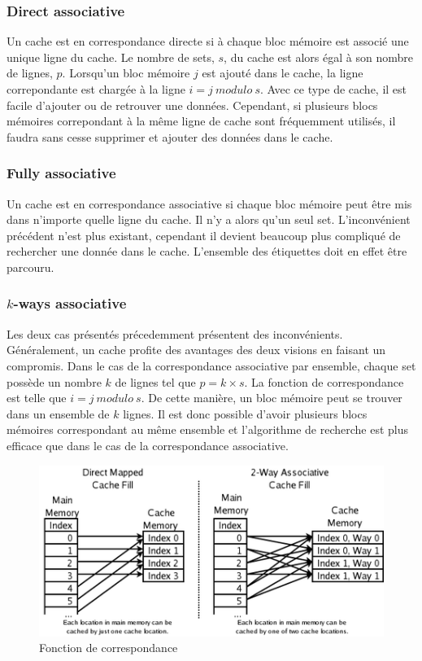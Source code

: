 \documentclass[a4paper]{article}
\begin{document}
\subsubsection{Direct associative}
\indent Un cache est en correspondance directe si à chaque bloc mémoire est associé une unique ligne du cache. Le nombre de sets, $s$, du cache est alors égal à son nombre de lignes, $p$. Lorsqu'un bloc mémoire $j$ est ajouté dans le cache, la ligne correpondante est chargée à la ligne $i = j\ modulo\ s$. Avec ce type de cache, il est facile d'ajouter ou de retrouver une données. Cependant, si plusieurs blocs mémoires correpondant à la même ligne de cache sont fréquemment utilisés, il faudra sans cesse supprimer et ajouter des données dans le cache.

\subsubsection{Fully associative}
\indent Un cache est en correspondance associative si chaque bloc mémoire peut être mis dans n'importe quelle ligne du cache. Il n'y a alors qu'un seul set. L'inconvénient précédent n'est plus existant, cependant il devient beaucoup plus compliqué de rechercher une donnée dans le cache. L'ensemble des étiquettes doit en effet être parcouru.

\subsubsection{$k$-ways associative}
\indent Les deux cas présentés précedemment présentent des inconvénients. Généralement, un cache profite des avantages des deux visions en faisant un compromis. Dans le cas de la correspondance associative par ensemble, chaque set possède un nombre $k$ de lignes tel que $p=k \times s$. La fonction de correspondance est telle que $i = j\ modulo\ s$. De cette manière, un bloc mémoire peut se trouver dans un ensemble de $k$ lignes. Il est donc possible d'avoir plusieurs blocs mémoires correspondant au même ensemble et l'algorithme de recherche est plus efficace que dans le cas de la correspondance associative.

\begin{figure}[!h]
\begin{center}
   \includegraphics[scale=0.60]{associative.png}
   \caption{\label{associative} Fonction de correspondance}
\end{center}
\end{figure}
\end{document}
